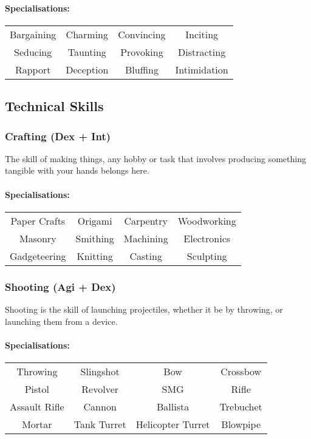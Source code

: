 \paragraph{Specialisations:}
\begin{center}
    \begin{tabular}{c|c|c|c}
        Bargaining & Charming & Convincing & Inciting \\
        Seducing & Taunting & Provoking & Distracting \\
        Rapport & Deception & Bluffing & Intimidation
    \end{tabular}
\end{center}

\subsection{Technical Skills}
\subsubsection{Crafting (Dex + Int)}
The skill of making things, any hobby or task that involves producing something tangible with your hands belongs here.

\paragraph{Specialisations:}
\begin{center}
    \begin{tabular}{c|c|c|c}
        Paper Crafts & Origami & Carpentry & Woodworking \\
        Masonry & Smithing & Machining & Electronics \\
        Gadgeteering & Knitting & Casting & Sculpting \\
    \end{tabular}
\end{center}

\subsubsection{Shooting (Agi + Dex)}
Shooting is the skill of launching projectiles, whether it be by throwing, or launching them from a device.

\paragraph{Specialisations:}
\begin{center}
    \begin{tabular}{c|c|c|c}
        Throwing & Slingshot & Bow & Crossbow \\
        Pistol & Revolver & SMG & Rifle \\
        Assault Rifle & Cannon & Ballista & Trebuchet \\
        Mortar & Tank Turret & Helicopter Turret & Blowpipe
    \end{tabular}
\end{center}

